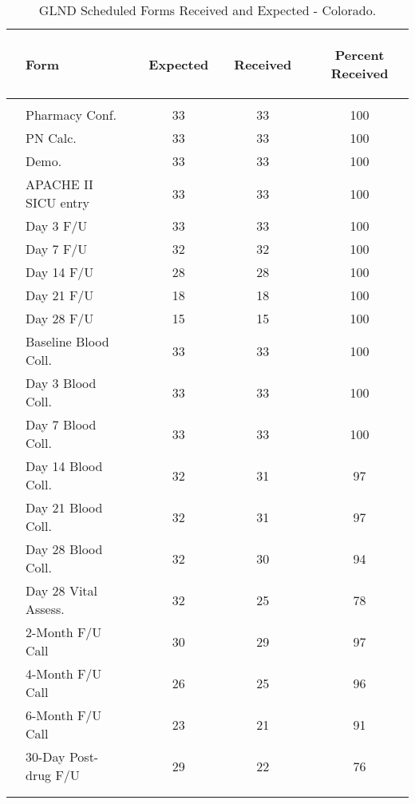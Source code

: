\documentclass[dvips, 10pt]{article}
\begin{document}
\clearpage
\begin{table}[t]
\caption
{ GLND Scheduled Forms Received and Expected - Colorado. }
\begin{center}
\begin{tabular}{ @{}l@{}
@{}l@{}@{}p{1.5em}@{}@{}c@{}@{}p{1.5em}@{}@{}c@{}@{}p{1.5em}@{}@{}c@{}
}
\hline

& \parbox{6em}{\begin{center}Form\end{center}} && \parbox{6em}{\begin{center}Expected\end{center}} && \parbox{6em}{\begin{center}Received\end{center}} && \parbox{6em}{\begin{center}Percent Received\end{center}} \\

\hline

\\
& Pharmacy Conf. && 33 && 33 && 100 \\
& PN Calc. && 33 && 33 && 100 \\
& Demo. && 33 && 33 && 100 \\
& APACHE II SICU entry && 33 && 33 && 100 \\
& Day 3 F/U && 33 && 33 && 100 \\
& Day 7 F/U && 32 && 32 && 100 \\
& Day 14 F/U && 28 && 28 && 100 \\
& Day 21 F/U && 18 && 18 && 100 \\
& Day 28 F/U && 15 && 15 && 100 \\
& Baseline Blood Coll. && 33 && 33 && 100 \\
& Day 3 Blood Coll. && 33 && 33 && 100 \\
& Day 7 Blood Coll. && 33 && 33 && 100 \\
& Day 14 Blood Coll. && 32 && 31 && 97 \\
& Day 21 Blood Coll. && 32 && 31 && 97 \\
& Day 28 Blood Coll. && 32 && 30 && 94 \\
& Day 28 Vital Assess. && 32 && 25 && 78 \\
& 2-Month F/U Call && 30 && 29 && 97 \\
& 4-Month F/U Call && 26 && 25 && 96 \\
& 6-Month F/U Call && 23 && 21 && 91 \\
& 30-Day Post-drug F/U && 29 && 22 && 76 \\
\\
\hline \\

\end{tabular}

\end{center}
 \end{table}
\end{document}
